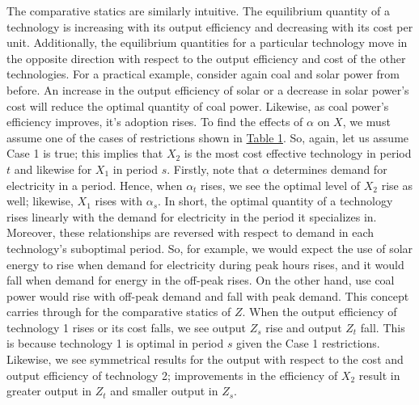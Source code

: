 \documentclass[11pt,a4paper]{extarticle}
\begin{document}
The comparative statics are similarly intuitive. The equilibrium quantity of a technology is increasing with its output efficiency and decreasing with its cost per unit. Additionally, the equilibrium quantities for a particular technology move in the opposite direction with respect to the output efficiency and cost of the other technologies. For a practical example, consider again coal and solar power from before. An increase in the output efficiency of solar or a decrease in solar power's cost will reduce the optimal quantity of coal power. Likewise, as coal power's efficiency improves, it's adoption rises. To find the effects of $\alpha$ on $X$, we must assume one of the cases of restrictions shown in \hyperref[tab:paramrest]{Table 1}. So, again, let us assume Case 1 is true; this implies that $X_2$ is the most cost effective technology in period $t$ and likewise for $X_1$ in period $s$. Firstly, note that $\alpha$ determines demand for electricity in a period. Hence, when $\alpha_t$ rises, we see the optimal level of $X_2$ rise as well; likewise, $X_1$ rises with $\alpha_s$. In short, the optimal quantity of a technology rises linearly with the demand for electricity in the period it specializes in. Moreover, these relationships are reversed with respect to demand in each technology's suboptimal period. So, for example, we would expect the use of solar energy to rise when demand for electricity during peak hours rises, and it would fall when demand for energy in the off-peak rises. On the other hand, use coal power would rise with off-peak demand and fall with peak demand. This concept carries through for the comparative statics of $Z$. When the output efficiency of technology 1 rises or its cost falls, we see output $Z_s$ rise and output $Z_t$ fall. This is because technology 1 is optimal in period $s$ given the Case 1 restrictions. Likewise, we see symmetrical results for the output with respect to the cost and output efficiency of technology 2; improvements in the efficiency of $X_2$ result in greater output in $Z_t$ and smaller output in $Z_s$.  
\end{document}
